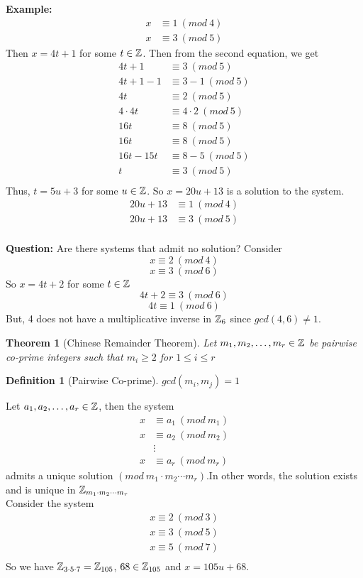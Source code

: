 \documentclass[openany]{report}
\newtheorem{theorem}{Theorem}[section]
\newtheorem{definition}{Definition}[section]
\begin{document}
\noindent
\textbf{Example:}
\begin{align*}
    x &\equiv 1 \ (mod \ 4)\\
    x &\equiv 3 \ (mod \ 5)
\end{align*}
Then $x = 4t + 1$ for some $t \in \mathbb{Z}$. Then from the second equation, we get 
\begin{align*}
    4t + 1 &\equiv 3 \ (mod \ 5)\\
    4t + 1 - 1 &\equiv 3 -1 \ (mod \ 5)\\
    4t  &\equiv 2 \ (mod \ 5)\\
    4\cdot4t  &\equiv 4\cdot2 \ (mod \ 5)\\
    16t  &\equiv 8 \ (mod \ 5)\\
    16t  &\equiv 8 \ (mod \ 5)\\
    16t - 15t  &\equiv 8 - 5\ (mod \ 5)\\
    t  &\equiv 3\ (mod \ 5)\\
\end{align*}
Thus, $t = 5u + 3$ for some $u \in \mathbb{Z}$. So $x = 20u + 13$ is a solution to the system. 
\begin{align*}
    20u + 13 &\equiv 1 \ (mod \ 4)\\
    20u + 13 &\equiv 3 \ (mod \ 5)\\
\end{align*}

\noindent
\textbf{Question:} Are there systems that admit no solution? Consider
$$x \equiv 2 \ (mod \ 4)$$
$$x \equiv 3 \ (mod \ 6)$$
So $x = 4t + 2$ for some $t \in \mathbb{Z}$
$$4t + 2 \equiv 3 \ (mod \ 6)$$
$$4t \equiv 1 \ (mod \ 6)$$
But, 4 does not have a multiplicative inverse in $\mathbb{Z}_6$ since $gcd(4,6)\neq 1$. 
\begin{theorem}[Chinese Remainder Theorem]
Let $m_1, m_2, \dots, m_r \in \mathbb{Z}$ be pairwise co-prime integers such that $m_i \geq 2$ for $1 \leq i \leq r$
\end{theorem}
\begin{definition}[Pairwise Co-prime]
    $gcd(m_i,m_j) = 1$
\end{definition}
Let $a_1, a_2, \dots, a_r \in \mathbb{Z}$, then the system
\begin{align*}
    x &\equiv a_1 \ (mod \ m_1)\\
    x &\equiv a_2 \ (mod \ m_2)\\
    &\vdots\\
    x &\equiv a_r \ (mod \ m_r)
\end{align*}
admits a unique solution $(mod \ m_1 \cdot m_2 \cdots m_r)$.In other words, the solution exists and is unique in $\mathbb{Z}_{m_1 \cdot m_2 \cdots m_r}$\\[2ex]
Consider the system
\begin{align*}
    x \equiv 2 \ (mod \ 3)\\
    x \equiv 3 \ (mod \ 5)\\
    x \equiv 5 \ (mod \ 7)\\
\end{align*}
So we have $\mathbb{Z}_{3 \cdot 5 \cdot 7} = \mathbb{Z}_{105}$, $68 \in \mathbb{Z}_{105}$ and $x = 105u + 68$. 
\end{document}
